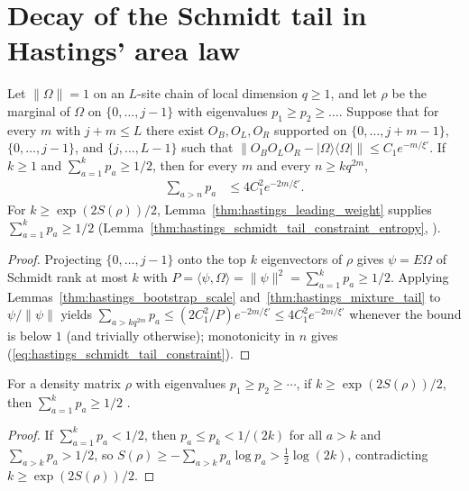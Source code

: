 \section{Decay of the Schmidt tail in Hastings' area law}
\label{sec:hastings_schmidt_tail}


\begin{lemma}
    \label{thm:hastings_schmidt_tail_constraint}
    \leanok
    Let $\|\Omega\|=1$ on an $L$-site chain of local dimension $q\ge1$, and let
    $\rho$ be the marginal of $\Omega$ on $\{0,\dots,j-1\}$ with eigenvalues
    $p_1\ge p_2\ge\dots$. Suppose that for every $m$ with $j+m\le L$ there
    exist $O_B,O_L,O_R$ supported on $\{0,\dots,j+m-1\}$, $\{0,\dots,j-1\}$, and
    $\{j,\dots,L-1\}$ such that
    $\|O_BO_LO_R-|\Omega\rangle\langle\Omega|\|\le C_1e^{-m/\xi'}$. If $k\ge1$
    and $\sum_{a=1}^kp_a\ge1/2$, then for every $m$ and every $n\ge kq^{2m}$,
    \begin{align}
        \sum_{a>n}p_a & \le 4C_1^2e^{-2m/\xi'}.
        \label{eq:hastings_schmidt_tail_constraint}
    \end{align}
    For $k\ge\exp(2S(\rho))/2$, Lemma~\ref{thm:hastings_leading_weight}
    supplies $\sum_{a=1}^kp_a\ge1/2$
    (Lemma~\ref{thm:hastings_schmidt_tail_constraint_entropy},
    \cite[lines 540--552]{Hastings2007AreaLaw}).
\end{lemma}
\begin{proof}\leanok
    Projecting $\{0,\dots,j-1\}$ onto the top $k$ eigenvectors of $\rho$ gives
    $\psi=E\Omega$ of Schmidt rank at most $k$ with
    $P=\langle\psi,\Omega\rangle=\|\psi\|^2=\sum_{a=1}^kp_a\ge1/2$. Applying
    Lemmas~\ref{thm:hastings_bootstrap_scale}
    and~\ref{thm:hastings_mixture_tail} to $\psi/\|\psi\|$ yields
    $\sum_{a>kq^{2m}}p_a\le(2C_1^2/P)e^{-2m/\xi'}\le4C_1^2e^{-2m/\xi'}$ whenever
    the bound is below $1$ (and trivially otherwise); monotonicity in $n$ gives
    (\ref{eq:hastings_schmidt_tail_constraint}).
\end{proof}

\begin{lemma}
    \label{thm:hastings_leading_weight}
    \leanok
    For a density matrix $\rho$ with eigenvalues $p_1\ge p_2\ge\cdots$, if
    $k\ge\exp(2S(\rho))/2$, then $\sum_{a=1}^kp_a\ge1/2$
    \cite[line 540]{Hastings2007AreaLaw}.
\end{lemma}
\begin{proof}\leanok
    If $\sum_{a=1}^kp_a<1/2$, then $p_a\le p_k<1/(2k)$ for all $a>k$ and
    $\sum_{a>k}p_a>1/2$, so
    $S(\rho)\ge-\sum_{a>k}p_a\log p_a>\tfrac12\log(2k)$, contradicting
    $k\ge\exp(2S(\rho))/2$.
\end{proof}

